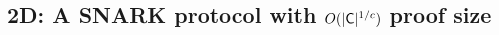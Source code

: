 \subsection{\name2D{}: A SNARK protocol with $O(|\mathsf{C}|^{1/c})$ proof size}
\begin{comment}
We will now describe \name2D{} in detail. The protocol explained in this section will have $O(|\C|^{1/c})$ proof size and $O(|\C|^{1-1/c})$ public key operations (and $O(|\C|)$ overall complexity) for the verifier. We  explain the interactive version of our protocol \name2D{}. \\

We reduce the query complexity and verifier efficiency in the interactive protocol by using homomorphic vector commitments over the RS encoded witness oracles. Let $x\in \FF^N$ be the witness vector. Let $m$ and $\ell$ be integers such that
$m\ell\geq N$. We choose ordered domains $G=\{\zeta_1,\ldots,\zeta_\ell\}$ and
$H=\{\eta_1,\ldots,\eta_n\}$. We then write the vectors $x$ as $x =
(x_{1},\ldots,x_{m})$ where each $x_{i}\in \FF^\ell$ for $i \in [m]$. 
Let $\hat{f}^x_{i}$ be the polynomial interpolating the vector $x_{i}$
on $G$ and let $f^x_{i}$ denote the corresponding evaluation of
$\hat{f}^x_{i}$ on $H$. We define the RS-encoded witness $\rsoracle\in
\FF^{m\times n}$ as $\rsoracle[i,j]=\hat{f}^x_{i}(\eta_j)$ for $i\in
[m]$ and $j\in [n]$. We now construct a commitment oracle $\comoracle$ from $\rsoracle$.
 
\subsubsection{Commitment Oracle}
Throughout, we assume $\FF$ is a prime field. Let $\comm$ denote the Pedersen
vector commitment scheme over $\FF^m$ with randomness space as $\FF$ and
commitment space as group $\GG$ with independent generators $g_1,\ldots,g_m, h$. 
Define $c_{j} = \comm(\rsoracle[\cdot,j],\delta_{j})$, $j\in [n]$ where the notation $X[\cdot,j]$
denotes the $m$-length vector $(X[1,j],\ldots,X[m,j])$ and $\delta_{j}$
denotes the randomness for computing the commitment $c_{j}$. We
define the oracle $\comoracle$ as $\comoracle[j]=c_{j}$. The oracle
$\comoracle$ answers queries of the type $Q\subseteq [n]$, responding with
elements $\comoracle[j]$ for $j\in Q$.\footnote{Defining the commitment vector as 
$\comoracle$ might seem superfluous here. But, the usage of $\comoracle$ will play 
a prominent role in our 3D protocol. We just define the notation here for the uniformity 
in our descriptions of the 2D and the 3D versions.} 


\end{comment}
